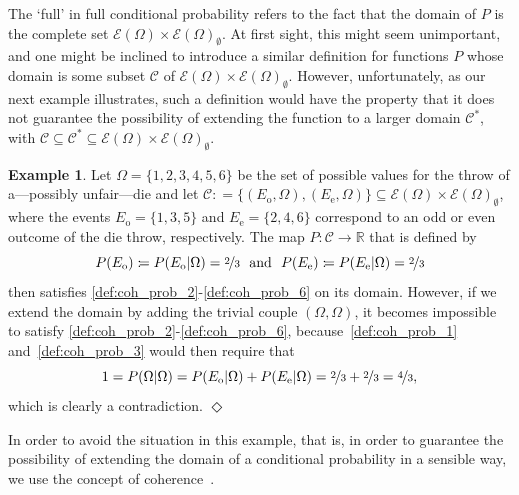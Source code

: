\documentclass[10pt,a4paper]{paper}
\theoremstyle{definition}
\newtheorem{exmp}{Example}
\newcommand{\reals}{\mathbb{R}}
\newcommand{\paths}{\Omega}
\newcommand{\power}{\mathcal{E}(\paths)}
\newcommand{\nonemptypower}{\power_{\emptyset}}
\newcommand{\coloneqq}{:\!=}
\newcommand{\exampleend}{\hfill$\Diamond$}
\begin{document}
The `full' in full conditional probability refers to the fact that the domain of $P$ is the complete set $\power\times\nonemptypower$. At first sight, this might seem unimportant, and one might be inclined to introduce a similar definition for functions $P$ whose domain is some subset $\mathcal{C}$ of $\power\times\nonemptypower$. However, unfortunately, as our next example illustrates, such a definition would have the property that it does not guarantee the possibility of extending the function to a larger domain $\mathcal{C}^*$, with $\mathcal{C}\subseteq\mathcal{C}^*\subseteq\power\times\nonemptypower$.

\begin{exmp}\label{exmp:F1F4cannotbeextended}
Let $\Omega=\{1,2,3,4,5,6\}$ be the set of possible values for the throw of a---possibly unfair---die and let $\mathcal{C}\coloneqq\{(E_{\mathrm{o}},\Omega),(E_{\mathrm{e}},\Omega)\}\subseteq\power\times\nonemptypower$, where the events $E_{\mathrm{o}}=\{1,3,5\}$ and $E_{\mathrm{e}}=\{2,4,6\}$ correspond to an odd or even outcome of the die throw, respectively. The map $P\colon\mathcal{C}\to\reals$ that is defined by
\begin{equation*}
P(E_{\mathrm{o}})\coloneqq P(E_{\mathrm{o}}\vert\Omega)=\nicefrac{2}{3}
~\text{ and }~
P(E_{\mathrm{e}})\coloneqq P(E_{\mathrm{e}}\vert\Omega)=\nicefrac{2}{3}
\end{equation*}
then satisfies \ref{def:coh_prob_2}-\ref{def:coh_prob_6} on its domain. However, if we extend the domain by adding the trivial couple $(\Omega,\Omega)$, it becomes impossible to satisfy \ref{def:coh_prob_2}-\ref{def:coh_prob_6}, because~\ref{def:coh_prob_1} and~\ref{def:coh_prob_3} would then require that
\begin{equation*}
1=P(\Omega\vert\Omega)=P(E_{\mathrm{o}}\vert\Omega)+P(E_{\mathrm{e}}\vert\Omega)=\nicefrac{2}{3}+\nicefrac{2}{3}=\nicefrac{4}{3},
\end{equation*}
which is clearly a contradiction.
\exampleend
\end{exmp}

In order to avoid the situation in this example, that is, in order to guarantee the possibility of extending the domain of a conditional probability in a sensible way, we use the concept of coherence~\cite{berti1991coherent,DeFinetti:oT_PWtAE,regazzini1985finitely,williams1975,Williams:2007eu}.
\end{document}
